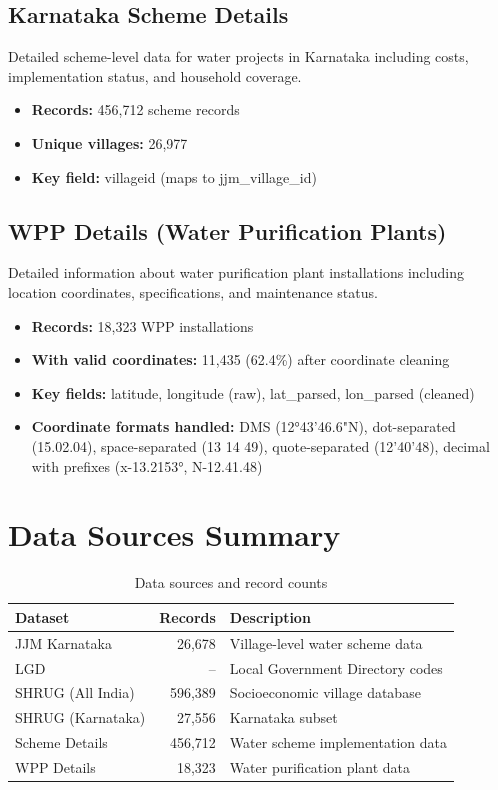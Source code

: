 \documentclass[11pt,a4paper]{article}
\begin{document}
\subsection{Karnataka Scheme Details}
Detailed scheme-level data for water projects in Karnataka including costs, implementation status, and household coverage.

\begin{itemize}
    \item \textbf{Records:} 456,712 scheme records
    \item \textbf{Unique villages:} 26,977
    \item \textbf{Key field:} villageid (maps to jjm\_village\_id)
\end{itemize}

\subsection{WPP Details (Water Purification Plants)}
Detailed information about water purification plant installations including location coordinates, specifications, and maintenance status.

\begin{itemize}
    \item \textbf{Records:} 18,323 WPP installations
    \item \textbf{With valid coordinates:} 11,435 (62.4\%) after coordinate cleaning
    \item \textbf{Key fields:} latitude, longitude (raw), lat\_parsed, lon\_parsed (cleaned)
    \item \textbf{Coordinate formats handled:} DMS (12°43'46.6"N), dot-separated (15.02.04), space-separated (13 14 49), quote-separated (12'40'48), decimal with prefixes (x-13.2153°, N-12.41.48)
\end{itemize}

\section{Data Sources Summary}

\begin{table}[h]
\centering
\begin{tabular}{lrp{5cm}}
\toprule
\textbf{Dataset} & \textbf{Records} & \textbf{Description} \\
\midrule
JJM Karnataka & 26,678 & Village-level water scheme data \\
LGD & -- & Local Government Directory codes \\
SHRUG (All India) & 596,389 & Socioeconomic village database \\
SHRUG (Karnataka) & 27,556 & Karnataka subset \\
Scheme Details & 456,712 & Water scheme implementation data \\
WPP Details & 18,323 & Water purification plant data \\
\bottomrule
\end{tabular}
\caption{Data sources and record counts}
\end{table}
\end{document}
